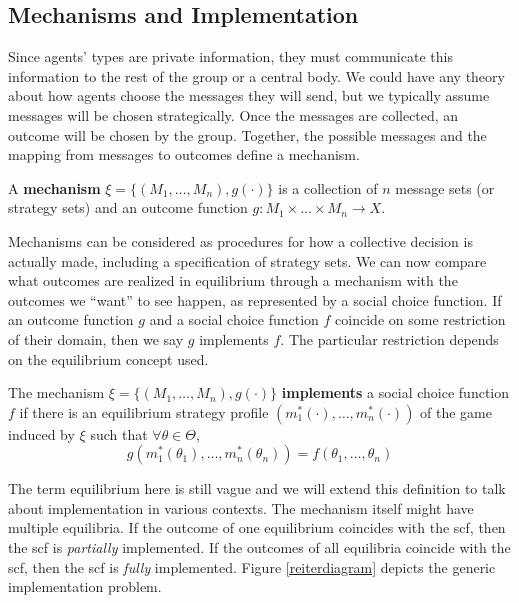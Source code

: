 \documentclass[10pt]{article}
\begin{document}
\begin{spacing}{1.0}
\section{Mechanisms and Implementation}

Since agents' types are private information, they must communicate this
information to the rest of the group or a central body. We could have any
theory about how agents choose the messages they will send, but we
typically assume messages will be chosen strategically. Once the messages
are collected, an outcome will be chosen by the group. Together, the
possible messages and the mapping from messages to outcomes define a
mechanism.

\begin{definition}
  A \textbf{mechanism} $\xi = \{(M_1, \ldots, M_n),
  g(\cdot)\}$ is a collection of $n$ message sets (or
  strategy sets) and an outcome function $g: M_1 \times
  \ldots \times M_n \to X$.
\end{definition}

Mechanisms can be considered as procedures for how a
collective decision is actually made, including a specification of
strategy sets. We can now compare what outcomes are
realized in equilibrium through a mechanism with the
outcomes we ``want'' to see happen, as represented by a
social choice function. If an outcome function $g$ and
a social choice function $f$ coincide on some restriction
of their domain, then we say $g$ implements $f$. The
particular restriction depends on the equilibrium concept used.

\begin{definition}
  The mechanism $\xi = \{(M_1, \ldots, M_n),
  g(\cdot)\}$ \textbf{implements} a social choice function $f$ if
  there is an equilibrium strategy profile
  $(m_1^*(\cdot), \ldots, m_n^*(\cdot))$ of the game
  induced by $\xi$ such that $\forall \theta \in \Theta$,
  \[g(m_1^*(\theta_1), \ldots, m_n^*(\theta_n)) =
  f(\theta_1, \ldots, \theta_n)\]
\end{definition}

The term equilibrium here is still vague and we will extend this definition
to talk about implementation in various contexts. The mechanism itself
might have multiple equilibria. If the outcome of one equilibrium coincides
with the scf, then the scf is \textit{partially} implemented. If the
outcomes of all equilibria coincide with the scf, then the scf is
\textit{fully} implemented.  Figure \ref{reiterdiagram} depicts the generic
implementation problem.



\end{spacing}
\end{document}
